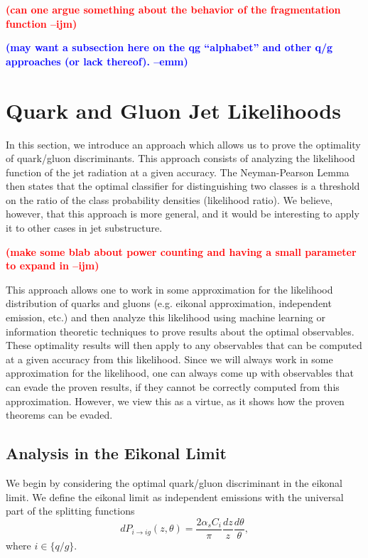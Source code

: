 \documentclass[letterpaper,11pt]{article}
\newcommand{\ijm}[1]{\marginpar{\raggedright\scriptsize\textbf{\textcolor{red}{ijm}}}  \textbf{\textcolor{red}{(#1 --ijm)}}}
\newcommand{\emm}[1]{\marginpar{\raggedright\scriptsize\textbf{\textcolor{blue}{emm}}}  \textbf{\textcolor{blue}{(#1 --emm)}}}
\begin{document}
\ijm{can one argue something about the behavior of the fragmentation function}

\noindent
\emm{may want a subsection here on the qg ``alphabet'' and other q/g approaches (or lack thereof).}






\section{Quark and Gluon Jet Likelihoods}
\label{sec:squirrel}

In this section, we introduce an approach which allows us to prove the optimality of quark/gluon discriminants.
%
This approach consists of analyzing the likelihood function of the jet radiation at a given accuracy.
%
The Neyman-Pearson Lemma~\cite{neyman1933ix} then states that the optimal classifier for distinguishing two classes is a threshold on the ratio of the class probability densities (likelihood ratio).  We believe, however, that this approach is more general, and it would be interesting to apply it to other cases in jet substructure.

\ijm{make some blab about power counting and having a small parameter to expand in}\cite{Larkoski:2014gra}\cite{Moult:2016cvt}\cite{Larkoski:2014zma}


This approach allows one to work in some approximation for the likelihood distribution of quarks and gluons (e.g. eikonal approximation, independent emission, etc.) and then analyze this likelihood using machine learning or information theoretic techniques to prove results about the optimal observables.
%
These optimality results will then apply to any observables that can be computed at a given accuracy from this likelihood.
%
Since we will always work in some approximation for the likelihood, one can always come up with observables that can evade the proven results, if they cannot be correctly computed from this approximation.
%
However, we view this as a virtue, as it shows how the proven theorems can be evaded.


\subsection{Analysis in the Eikonal Limit}\label{sec:eik}

We begin by considering the optimal quark/gluon discriminant in the eikonal limit. We define the eikonal limit as independent emissions with the universal part of the splitting functions
\begin{equation}
\label{eq:LLemit}
dP_{i\to i g}(z,\theta) = \frac{2 \alpha_s C_i}{\pi} \frac{dz}{z}\frac{d\theta}{\theta},
\end{equation}
where $i\in\{q/g\}$.
\end{document}
